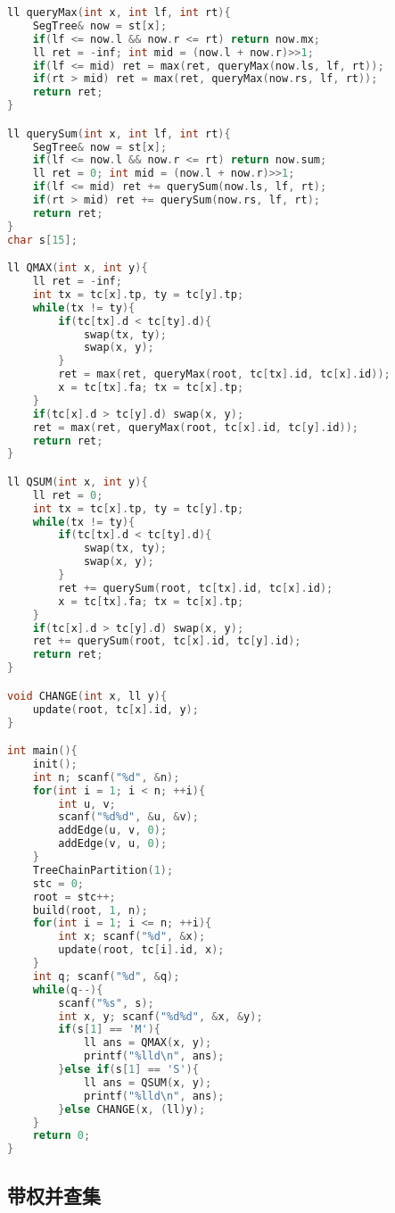 \begin{lstlisting}[language=C++]
ll queryMax(int x, int lf, int rt){
    SegTree& now = st[x];
    if(lf <= now.l && now.r <= rt) return now.mx;
    ll ret = -inf; int mid = (now.l + now.r)>>1;
    if(lf <= mid) ret = max(ret, queryMax(now.ls, lf, rt));
    if(rt > mid) ret = max(ret, queryMax(now.rs, lf, rt));
    return ret;
}

ll querySum(int x, int lf, int rt){
    SegTree& now = st[x];
    if(lf <= now.l && now.r <= rt) return now.sum;
    ll ret = 0; int mid = (now.l + now.r)>>1;
    if(lf <= mid) ret += querySum(now.ls, lf, rt);
    if(rt > mid) ret += querySum(now.rs, lf, rt);
    return ret;
}
char s[15];

ll QMAX(int x, int y){
    ll ret = -inf;
    int tx = tc[x].tp, ty = tc[y].tp;
    while(tx != ty){
        if(tc[tx].d < tc[ty].d){
            swap(tx, ty);
            swap(x, y);
        }
        ret = max(ret, queryMax(root, tc[tx].id, tc[x].id));
        x = tc[tx].fa; tx = tc[x].tp;
    }
    if(tc[x].d > tc[y].d) swap(x, y);
    ret = max(ret, queryMax(root, tc[x].id, tc[y].id));
    return ret;
}

ll QSUM(int x, int y){
    ll ret = 0;
    int tx = tc[x].tp, ty = tc[y].tp;
    while(tx != ty){
        if(tc[tx].d < tc[ty].d){
            swap(tx, ty);
            swap(x, y);
        }
        ret += querySum(root, tc[tx].id, tc[x].id);
        x = tc[tx].fa; tx = tc[x].tp;
    }
    if(tc[x].d > tc[y].d) swap(x, y);
    ret += querySum(root, tc[x].id, tc[y].id);
    return ret;
}

void CHANGE(int x, ll y){
    update(root, tc[x].id, y);
}

int main(){
    init();
    int n; scanf("%d", &n);
    for(int i = 1; i < n; ++i){
        int u, v;
        scanf("%d%d", &u, &v);
        addEdge(u, v, 0);
        addEdge(v, u, 0);
    }
    TreeChainPartition(1);
    stc = 0;
    root = stc++;
    build(root, 1, n);
    for(int i = 1; i <= n; ++i){
        int x; scanf("%d", &x);
        update(root, tc[i].id, x);
    }
    int q; scanf("%d", &q);
    while(q--){
        scanf("%s", s);
        int x, y; scanf("%d%d", &x, &y);
        if(s[1] == 'M'){
            ll ans = QMAX(x, y);
            printf("%lld\n", ans);
        }else if(s[1] == 'S'){
            ll ans = QSUM(x, y);
            printf("%lld\n", ans);
        }else CHANGE(x, (ll)y);
    }
    return 0;
}
\end{lstlisting}

\subsection{带权并查集}

